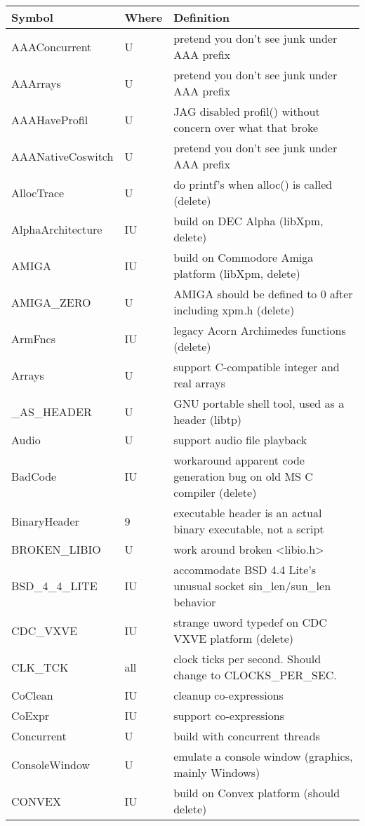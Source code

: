 \begin{xtabular}{|m{1.8in}|m{0.5in}|m{4.0in}|}
\hline
Symbol & Where & Definition \\ \hline
AAAConcurrent & U & pretend you don't see junk under AAA prefix \\
AAArrays & U & pretend you don't see junk under AAA prefix \\
AAAHaveProfil & U & JAG disabled profil() without concern over what that broke\\
AAANativeCoswitch & U & pretend you don't see junk under AAA prefix \\
AllocTrace & U & do printf's when alloc() is called (delete) \\
AlphaArchitecture & IU & build on DEC Alpha (libXpm, delete) \\
AMIGA & IU & build on Commodore Amiga platform (libXpm, delete) \\ 
AMIGA\_ZERO & U & AMIGA should be defined to 0 after including xpm.h (delete) \\ 
ArmFncs & IU & legacy Acorn Archimedes functions (delete) \\
Arrays & U & support C-compatible integer and real arrays \\
\_AS\_HEADER & U & GNU portable shell tool, used as a header (libtp) \\
Audio & U & support audio file playback \\
BadCode & IU & workaround apparent code generation bug on old MS C compiler (delete) \\
BinaryHeader & 9 & executable header is an actual binary executable,
		not a script \\
BROKEN\_LIBIO & U & work around broken <libio.h> \\
BSD\_4\_4\_LITE & IU & accommodate BSD 4.4 Lite's unusual socket sin\_len/sun\_len behavior \\
CDC\_VXVE & IU & strange uword typedef on CDC VXVE platform (delete) \\
CLK\_TCK & all & clock ticks per second. Should change to CLOCKS\_PER\_SEC. \\
CoClean & IU & cleanup co-expressions \\
CoExpr & IU & support co-expressions \\
Concurrent & U & build with concurrent threads \\
ConsoleWindow & U & emulate a console window (graphics, mainly Windows) \\
CONVEX & IU & build on Convex platform (should delete) \\

\end{xtabular}
